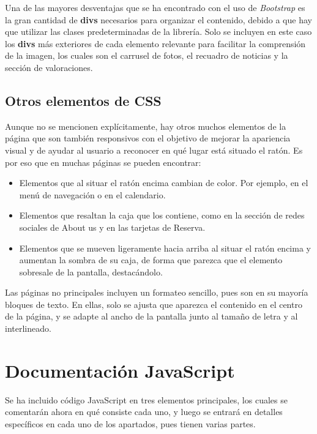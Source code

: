 \documentclass[11pt, a4paper]{book}
\begin{document}
	Una de las mayores desventajas que se ha encontrado con el uso de \textit{Bootstrap} es la gran cantidad de \textbf{divs} necesarios para organizar el contenido, debido a que hay que utilizar las clases predeterminadas de la librería. Solo se incluyen en este caso los \textbf{divs} más exteriores de cada elemento relevante para facilitar la comprensión de la imagen, los cuales son el carrusel de fotos, el recuadro de noticias y la sección de valoraciones.
	
	
	
	\section{Otros elementos de CSS}
	Aunque no se mencionen explícitamente, hay otros muchos elementos de la página que son también responsivos con el objetivo de mejorar la apariencia visual y de ayudar al usuario a reconocer en qué lugar está situado el ratón. Es por eso que en muchas páginas se pueden encontrar:
	
	\begin{itemize}
		\item Elementos que al situar el ratón encima cambian de color. Por ejemplo, en el menú de navegación o en el calendario.
		\item Elementos que resaltan la caja que los contiene, como en la sección de redes sociales de About us y en las tarjetas de Reserva.
		\item Elementos que se mueven ligeramente hacia arriba al situar el ratón encima y aumentan la sombra de su caja, de forma que parezca que el elemento sobresale de la pantalla, destacándolo. 
	\end{itemize}
	
	Las páginas no principales incluyen un formateo sencillo, pues son en su mayoría bloques de texto. En ellas, solo se ajusta que aparezca el contenido en el centro de la página, y se adapte al ancho de la pantalla junto al tamaño de letra y al interlineado.
	
	
	
	
	\chapter{Documentación JavaScript}	
	
	Se ha incluido código JavaScript en tres elementos principales, los cuales se comentarán ahora en qué consiste cada uno, y luego se entrará en detalles específicos en cada uno de los apartados, pues tienen varias partes.
	
\end{document}
